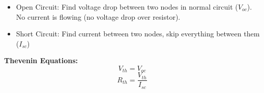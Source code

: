 \documentclass{article}\usepackage{amsmath,amssymb,amsthm,tikz,tkz-graph,color,chngpage,soul,hyperref,csquotes,graphicx,floatrow}\newcommand*{\QEDB}{\hfill\ensuremath{\square}}\newtheorem*{prop}{Proposition}\renewcommand{\theenumi}{\alph{enumi}}\usepackage[shortlabels]{enumitem}\usepackage[nobreak=true]{mdframed}\usetikzlibrary{matrix,calc}\MakeOuterQuote{"}\usepackage[margin=0.75in]{geometry} \newtheorem{theorem}{Theorem}
\begin{document}
\begin{itemize}
\item Open Circuit: Find voltage drop between two nodes in normal circuit ($V_{oc}$). No current is flowing (no voltage drop over resistor).
\item Short Circuit: Find current between two nodes, skip everything between them ($I_{sc}$)
\end{itemize}
\begin{mdframed}
\textbf{Thevenin Equations:}\\
\begin{equation}V_{th} = V_{oc}\end{equation}
\begin{equation}R_{th} = \frac{V_{th}}{I_{sc}}\end{equation}
\end{mdframed}
\end{document}
